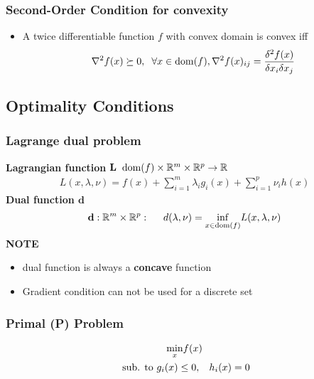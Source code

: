 \subsubsection{Second-Order Condition for convexity}
\begin{itemize}
    \item A twice differentiable function $f$ with convex domain is convex iff 
    \begin{gather*}
        \nabla ^2 f(x) \succeq 0, \hspace{2mm} \forall x \in \mathrm{dom}(f), \nabla^2f(x)_{ij}=\frac{\delta^2f(x)}{\delta x_i \delta x_j}
    \end{gather*}
\end{itemize}
\subsection{Optimality Conditions}
\subsubsection{Lagrange dual problem}
\textbf{Lagrangian function}
    $\mathbf{L \hspace{2mm}}\mathrm{dom}(f) \times \mathbb{R}^m \times \mathbb{R}^p \rightarrow \mathbb{R}$
\begin{gather*}
    L(x,\lambda,\nu) = f(x) + \sum^m_{i=1} \lambda_i g_i(x)+\sum^p_{i=1}\nu_ih(x)
\end{gather*}
\textbf{Dual function $\mathbf{d}$}
\begin{gather*}
    \mathbf{d}: \mathbb{R}^m\times \mathbb{R}^p: \hspace{5mm} d(\lambda,\nu) = \underset{x\in\mathrm{dom}(f)}{\mathrm{inf}}L(x,\lambda,\nu)
\end{gather*}
\vfill\null\columnbreak
\textbf{NOTE}
\begin{itemize}
    \item dual function is always a \textbf{concave} function
    \item Gradient condition can not be used for a discrete set
\end{itemize}
\subsubsection{Primal (P) Problem}
\begin{gather*}
    \underset{x}{\mathrm{min}}f(x)\\
    \textrm{ sub. to } g_i(x) \leq 0,\hspace{3mm} h_i(x) = 0
\end{gather*}

